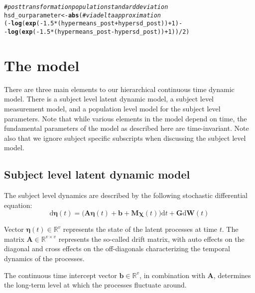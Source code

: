 \documentclass[nojss]{jss}\usepackage[]{graphicx}\usepackage[]{color}
\makeatletter
\newcommand{\hlnum}[1]{\textcolor[rgb]{0.686,0.059,0.569}{#1}}%
\newcommand{\hlcom}[1]{\textcolor[rgb]{0.678,0.584,0.686}{\textit{#1}}}%
\newcommand{\hlopt}[1]{\textcolor[rgb]{0,0,0}{#1}}%
\newcommand{\hlstd}[1]{\textcolor[rgb]{0.345,0.345,0.345}{#1}}%
\newcommand{\hlkwb}[1]{\textcolor[rgb]{0.69,0.353,0.396}{#1}}%
\newcommand{\hlkwd}[1]{\textcolor[rgb]{0.737,0.353,0.396}{\textbf{#1}}}%
\newenvironment{kframe}{%
 \def\at@end@of@kframe{}%
 \ifinner\ifhmode%
  \def\at@end@of@kframe{\end{minipage}}%
  \begin{minipage}{\columnwidth}%
 \fi\fi%
 \def\FrameCommand##1{\hskip\@totalleftmargin \hskip-\fboxsep
 \colorbox{shadecolor}{##1}\hskip-\fboxsep
     \hskip-\linewidth \hskip-\@totalleftmargin \hskip\columnwidth}%
 \MakeFramed {\advance\hsize-\width
   \@totalleftmargin\z@ \linewidth\hsize
   \@setminipage}}%
 {\par\unskip\endMakeFramed%
 \at@end@of@kframe}
\newenvironment{knitrout}{}{} %
\newcommand{\vect}[1]{\boldsymbol{\mathbf{#1}}}
\makeatother
\begin{document}
\begin{knitrout}
\begin{kframe}
\begin{alltt}
\hlcom{#post transformation population standard deviation}
\hlstd{hsd_ourparameter} \hlkwb{<-} \hlkwd{abs}\hlstd{(} \hlcom{#via delta approximation}
  \hlstd{(}\hlopt{-}\hlkwd{log}\hlstd{(}\hlkwd{exp}\hlstd{(}\hlopt{-}\hlnum{1.5} \hlopt{*} \hlstd{(hypermeans_post} \hlopt{+} \hlstd{hypersd_post))} \hlopt{+} \hlnum{1}\hlstd{)} \hlopt{-}
   \hlopt{-}\hlkwd{log}\hlstd{(}\hlkwd{exp}\hlstd{(}\hlopt{-}\hlnum{1.5} \hlopt{*} \hlstd{(hypermeans_post} \hlopt{-} \hlstd{hypersd_post))} \hlopt{+} \hlnum{1}\hlstd{) )} \hlopt{/} \hlnum{2}\hlstd{)}
\end{alltt}
\end{kframe}
\end{knitrout}



\section{The model}
There are three main elements to our hierarchical continuous time dynamic model. There is a subject level latent dynamic model, a subject level measurement model, and a population level model for the subject level parameters. Note that while various elements in the model depend on time, the fundamental parameters of the model as described here are time-invariant. Note also that we ignore subject specific subscripts when discussing the subject level model.

\subsection{Subject level latent dynamic model}
The subject level dynamics are described by the following stochastic differential equation:
\begin{equation}
\label{eq:process1}
\mathrm{d} \vect{\eta} (t) =
\bigg( 
\vect{A \eta} (t) +
\vect{b} +
\vect{M \chi} (t)  
\bigg) \mathrm{d} t +
\vect{G} \mathrm{d} \vect{W}(t)  
\end{equation}

Vector $ \vect{\eta} (t)\in\mathbb{R}^{v}$ represents the state of the latent processes at time $t$. The matrix $ \vect{A} \in \mathbb{R}^{v \times v}$ represents the so-called drift matrix, with auto effects on the diagonal and cross effects on the off-diagonals characterizing the temporal dynamics of the processes. 

The continuous time intercept vector $ \vect{b} \in\mathbb{R}^{v}$, in combination with $\vect{A}$, determines the long-term level at which the processes fluctuate around.
\end{document}
